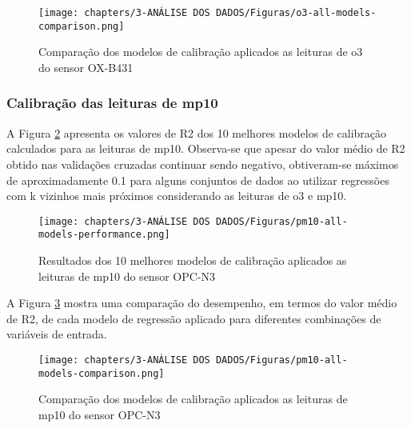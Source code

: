 \begin{figure}[h]
    \centering
    \caption{Comparação dos modelos de calibração aplicados as leituras de \acrshort{o3} do sensor OX-B431}
    \texttt{[image: chapters/3-ANÁLISE DOS DADOS/Figuras/o3-all-models-comparison.png]}
    \label{fig:data-o3-all-models-comparison}
\end{figure}

\subsubsection{Calibração das leituras de \acrshort{mp10}}

A Figura \ref{fig:data-pm10-all-models-performance} apresenta os valores de R2 dos 10 melhores modelos de calibração calculados para as leituras de \acrshort{mp10}. Observa-se que apesar do valor médio de R2 obtido nas validações cruzadas continuar sendo negativo, obtiveram-se máximos de aproximadamente 0.1 para alguns conjuntos de dados ao utilizar regressões com k vizinhos mais próximos considerando as leituras de \acrshort{o3} e \acrshort{mp10}.

\begin{figure}[h]
    \centering
    \caption{Resultados dos 10 melhores modelos de calibração aplicados as leituras de \acrshort{mp10} do sensor OPC-N3}
    \texttt{[image: chapters/3-ANÁLISE DOS DADOS/Figuras/pm10-all-models-performance.png]}
    \label{fig:data-pm10-all-models-performance}
\end{figure}

A Figura \ref{fig:data-pm10-all-models-comparison} mostra uma comparação do desempenho, em termos do valor médio de R2, de cada modelo de regressão aplicado para diferentes combinações de variáveis de entrada.

\begin{figure}[h]
    \centering
    \caption{Comparação dos modelos de calibração aplicados as leituras de \acrshort{mp10} do sensor OPC-N3}
    \texttt{[image: chapters/3-ANÁLISE DOS DADOS/Figuras/pm10-all-models-comparison.png]}
    \label{fig:data-pm10-all-models-comparison}
\end{figure}
